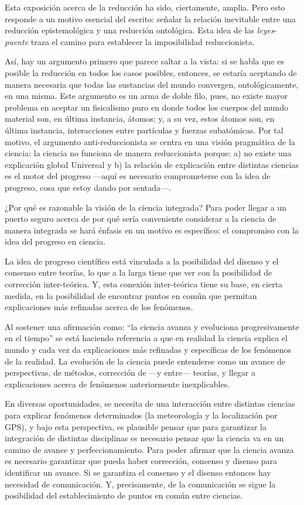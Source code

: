\documentclass[]{book}
\begin{document}
Esta exposición acerca de la reducción ha sido, ciertamente, amplia.
Pero esto responde a un motivo esencial del escrito: señalar la relación
inevitable entre una reducción epistemológica y una reducción
ontológica. Esta idea de las \emph{leyes}-\emph{puente} traza el camino
para establecer la imposibilidad reduccionista.

Así, hay un argumento primero que parece saltar a la vista: si se habla
que es posible la reducción en todos los casos posibles, entonces, se
estaría aceptando de manera necesaria que todas las sustancias del mundo
convergen, ontológicamente, en una misma. Este argumento es un arma de
doble filo, pues, no existe mayor problema en aceptar un fisicalismo
puro en donde todos los cuerpos del mundo material son, en última
instancia, átomos; y, a su vez, estos átomos son, en última instancia,
interacciones entre partículas y fuerzas subatómicas. Por tal motivo, el
argumento anti-reduccionista se centra en una visión pragmática de la
ciencia: la ciencia no funciona de manera reduccionista porque: a) no
existe una explicación global Universal y b) la relación de explicación
entre distintas ciencias es el motor del progreso ---aquí es necesario
comprometerse con la idea de progreso, cosa que estoy dando por
sentada---.

¿Por qué es razonable la visión de la ciencia integrada? Para poder
llegar a un puerto seguro acerca de por qué sería conveniente considerar
a la ciencia de manera integrada se hará énfasis en un motivo es
específico: el compromiso con la idea del progreso en ciencia.

La idea de progreso científico está vinculada a la posibilidad del
disenso y el consenso entre teorías, lo que a la larga tiene que ver con
la posibilidad de corrección inter-teórica. Y, esta conexión
inter-teórica tiene su base, en cierta medida, en la posibilidad de
encontrar puntos en común que permitan explicaciones más refinadas
acerca de los fenómenos.

Al sostener una afirmación como: ``la ciencia avanza y evoluciona
progresivamente en el tiempo'' se está haciendo referencia a que en
realidad la ciencia explica el mundo y cada vez da explicaciones más
refinadas y específicas de los fenómenos de la realidad. La evolución de
la ciencia puede entenderse como un avance de perspectivas, de métodos,
corrección de ---y entre--- teorías, y llegar a explicaciones acerca de
fenómenos anteriormente inexplicables.

En diversas oportunidades, se necesita de una interacción entre
distintas ciencias para explicar fenómenos determinados (la meteorología
y la localización por GPS), y bajo esta perspectiva, es plausible pensar
que para garantizar la integración de distintas disciplinas es necesario
pensar que la ciencia va en un camino de avance y perfeccionamiento.
Para poder afirmar que la ciencia avanza es necesario garantizar que
pueda haber corrección, consenso y disenso para identificar un avance.
Si se garantiza el consenso y el disenso entonces hay necesidad de
comunicación. Y, precisamente, de la comunicación se sigue la
posibilidad del establecimiento de puntos en común entre ciencias.
\end{document}
